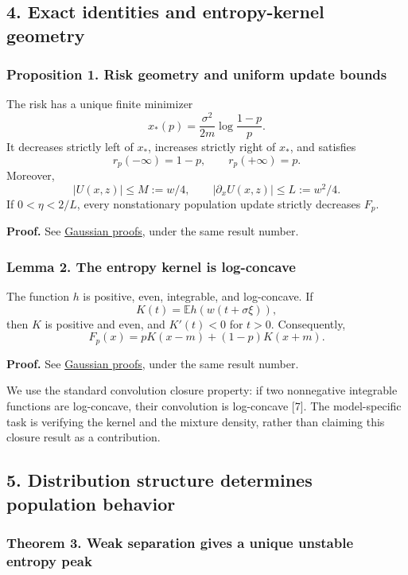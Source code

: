 \subsection{4. Exact identities and entropy-kernel
geometry}\label{draft-exact-identities-and-entropy-kernel-geometry}

\subsubsection{Proposition 1. Risk geometry and uniform update
bounds}\label{draft-proposition-1.-risk-geometry-and-uniform-update-bounds}

The risk has a unique finite minimizer \[
x_*(p)=\frac{\sigma^2}{2m}\log\frac{1-p}{p}.
\] It decreases strictly left of \(x_*\), increases strictly right of
\(x_*\), and satisfies \[
r_p(-\infty)=1-p,\qquad r_p(+\infty)=p.
\] Moreover, \[
|U(x,z)|\le M:=w/4,\qquad
|\partial_xU(x,z)|\le L:=w^2/4.
\] If \(0<\eta<2/L\), every nonstationary population update strictly
decreases \(F_p\).

\textbf{Proof.} See \href{gaussian_proofs.md}{Gaussian proofs}, under
the same result number.

\subsubsection{Lemma 2. The entropy kernel is
log-concave}\label{draft-lemma-2.-the-entropy-kernel-is-log-concave}

The function \(h\) is positive, even, integrable, and log-concave. If \[
K(t)=\mathbb E h(w(t+\sigma\xi)),
\] then \(K\) is positive and even, and \(K'(t)<0\) for \(t>0\).
Consequently, \[
F_p(x)=pK(x-m)+(1-p)K(x+m).
\]

\textbf{Proof.} See \href{gaussian_proofs.md}{Gaussian proofs}, under
the same result number.

We use the standard convolution closure property: if two nonnegative
integrable functions are log-concave, their convolution is log-concave
{[}7{]}. The model-specific task is verifying the kernel and the mixture
density, rather than claiming this closure result as a contribution.

\subsection{5. Distribution structure determines population
behavior}\label{draft-distribution-structure-determines-population-behavior}

\subsubsection{Theorem 3. Weak separation gives a unique unstable
entropy
peak}\label{draft-theorem-3.-weak-separation-gives-a-unique-unstable-entropy-peak}

